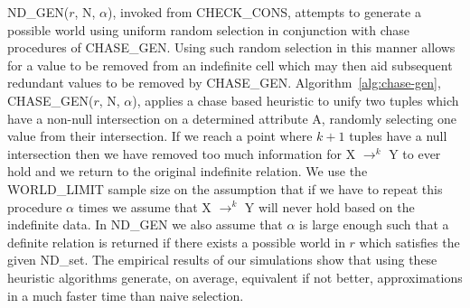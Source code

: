 ND\_GEN($r$, N, $\alpha$), invoked from
CHECK\_CONS, attempts to generate a possible world using uniform random
selection in conjunction with chase procedures of CHASE\_GEN. 
Using such random
selection in this manner allows for a value to be removed from an
indefinite cell which may then aid subsequent redundant values to be
removed by CHASE\_GEN.
Algorithm~\ref{alg:chase-gen}, CHASE\_GEN($r$, N, $\alpha$), applies a
chase based heuristic to unify two tuples which have a non-null
intersection on a determined attribute A, randomly selecting one value
from their intersection. If we reach a point where $k+1$ tuples have
a null intersection then we have removed too much information for X
$\to^k$ Y to ever hold and we return to the original indefinite
relation. We use the WORLD\_LIMIT sample size on the assumption that
if we have to repeat this procedure $\alpha$ times we assume that X
$\to^k$ Y will never hold based on the indefinite data. In ND\_GEN we
also assume that $\alpha$ is large enough such that a definite
relation is returned if there exists a possible world in $r$ which
satisfies the given ND\_set. The empirical results of our simulations
show that using these heuristic algorithms generate, on average, equivalent
if not better, approximations in a much faster time than naive selection.



